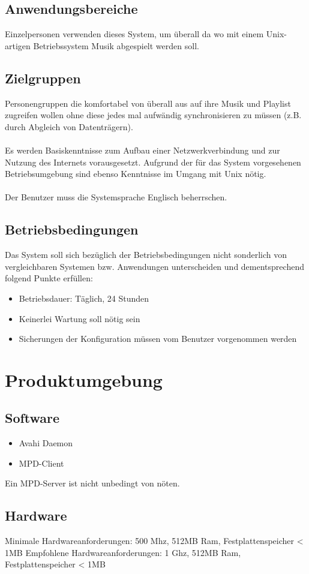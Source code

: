 \subsection{Anwendungsbereiche}
Einzelpersonen verwenden dieses System, um überall da wo mit 
einem Unix-artigen Betriebssystem Musik abgespielt werden soll.
\subsection{Zielgruppen}
Personengruppen die komfortabel von überall aus auf ihre Musik und Playlist zugreifen
wollen ohne diese jedes mal aufwändig synchronisieren zu müssen (z.B. durch Abgleich von Datenträgern).\ \\ \\
Es werden Basiskenntnisse zum Aufbau einer Netzwerkverbindung und zur Nutzung des Internets vorausgesetzt.
Aufgrund der für das System vorgesehenen Betriebsumgebung sind ebenso Kenntnisse im Umgang mit Unix nötig.\ \\ \\
Der Benutzer muss die Systemsprache Englisch beherrschen.
\subsection{Betriebsbedingungen}
Das System soll sich bezüglich der Betriebsbedingungen nicht sonderlich von vergleichbaren Systemen bzw.
Anwendungen unterscheiden und dementsprechend folgend Punkte erfüllen:
\begin{itemize}
	\item Betriebsdauer: Täglich, 24 Stunden
	\item Keinerlei Wartung soll nötig sein
	\item Sicherungen der Konfiguration müssen vom Benutzer vorgenommen werden
\end{itemize}
\section{Produktumgebung}
\subsection{Software}
\begin{itemize}
	\item Avahi Daemon
	\item MPD-Client
\end{itemize}
Ein MPD-Server ist nicht unbedingt von nöten.
\subsection{Hardware}
Minimale Hardwareanforderungen: 500 Mhz, 512MB Ram, Festplattenspeicher < 1MB
Empfohlene Hardwareanforderungen: 1 Ghz, 512MB Ram, Festplattenspeicher < 1MB
